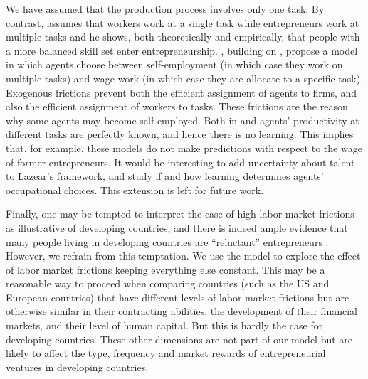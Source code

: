 \documentclass[12pt,american]{paper}
\theoremstyle{remark}
\begin{document}
We have assumed that the production process involves only one task. By contrast, \citet{lazear2004balanced} assumes that workers work at a single task while entrepreneurs work at multiple tasks and he shows, both theoretically and empirically, that people with a more balanced skill set enter entrepreneurship. \citet*{aastebro2011stars}, building on \citet{lazear2004balanced}, propose a model in which agents choose between self-employment (in which case they work on multiple tasks) and wage work (in which case they are allocate to a specific task). Exogenous frictions prevent both the efficient assignment of agents to firms, and also the efficient assignment of workers to tasks. These frictions are the reason why some agents may become self employed. Both in \citet{lazear2004balanced}  and \citet{aastebro2011stars} agents' productivity at different tasks are perfectly known, and hence there is no learning. This implies that, for example, these models do not  make predictions with respect to the wage of former entrepreneurs.
It would be interesting to add uncertainty about talent to Lazear's framework, and study if and how learning determines agents' occupational choices. This extension is left for future work. 

Finally, one may be tempted to interpret the case of high labor market frictions as illustrative of developing countries, and there is indeed ample evidence that many people living in developing countries are ``reluctant'' entrepreneurs  \citep{pooreconomics}. However, we refrain from this temptation. We use the model to explore the effect of labor market frictions keeping everything else constant. This may be a reasonable way to proceed when comparing countries (such as the US and European countries) that have different levels of labor market frictions but are otherwise similar in their contracting abilities, the development of their financial markets, and their level of human capital. But this is hardly the case for developing countries.  These other dimensions are not part of our model but are likely to affect the type, frequency and market rewards of entrepreneurial ventures in developing countries.
\end{document}
